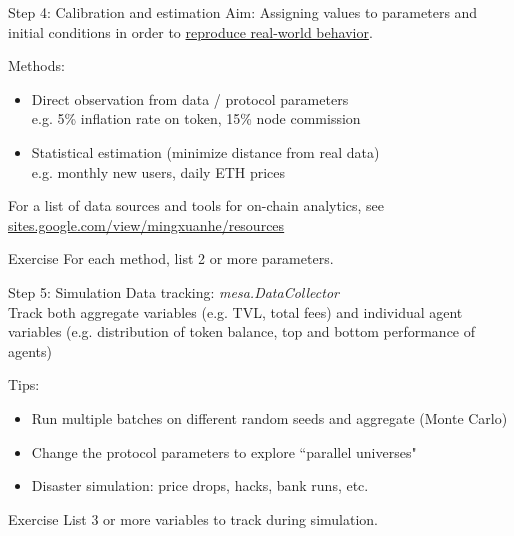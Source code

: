 \documentclass{beamer}
\begin{document}
\begin{frame}[fragile]{Step 4: Calibration and estimation}
    Aim: Assigning values to parameters and initial conditions in order to \underline{reproduce real-world behavior}.

    \bigskip
    
    Methods:
    \begin{itemize}
        \item Direct observation from data / protocol parameters\\
        e.g. 5\% inflation rate on token, 15\% node commission
        \item Statistical estimation (minimize distance from real data)\\
        e.g. monthly new users, daily ETH prices
    \end{itemize}
    For a list of data sources and tools for on-chain analytics, see \href{https://sites.google.com/view/mingxuanhe/resources}{\underline{sites.google.com/view/mingxuanhe/resources}}
    \begin{block}{Exercise}
        For each method, list 2 or more parameters.
    \end{block}
\end{frame}

\begin{frame}{Step 5: Simulation}
    Data tracking: \textit{mesa.DataCollector}\\
    Track both aggregate variables (e.g. TVL, total fees) and individual agent variables (e.g. distribution of token balance, top and bottom performance of agents)

    \bigskip
    
    Tips:
    \begin{itemize}
        \item Run multiple batches on different random seeds and aggregate (Monte Carlo)
        \item Change the protocol parameters to explore ``parallel universes"
        \item Disaster simulation: price drops, hacks, bank runs, etc.
    \end{itemize}
    \begin{block}{Exercise}
        List 3 or more variables to track during simulation.
    \end{block}
    
\end{frame}
\end{document}
